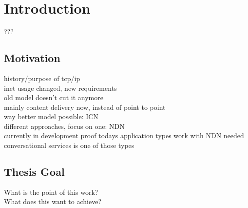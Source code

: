 \chapter{Introduction} \label{chapter:Introduction}
???

\section{Motivation}
history/purpose of tcp/ip \\
inet usage changed, new requirements \\
old model doesn't cut it anymore \\
mainly content delivery now, instead of point to point \\
way better model possible: ICN \\
different approaches, focus on one: NDN \\
currently in development
proof todays application types work with NDN needed\\
conversational services is one of those types \\

\section{Thesis Goal}
What is the point of this work? \\
What does this want to achieve? \\

